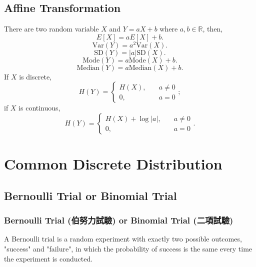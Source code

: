 \documentclass[a4paper,12pt]{report}
\begin{document}
\subsection{Affine Transformation}
There are two random variable $X$ and $Y=aX+b$ where $a,b\in\mathbb{R}$, then,
\[E[X]=aE[X]+b.\]
\[\text{Var}(Y)=a^2\text{Var}(X).\]
\[\text{SD}(Y)=|a|\text{SD}(X).\]
\[\text{Mode}(Y)=a\text{Mode}(X)+b.\]
\[\text{Median}(Y)=a\text{Median}(X)+b.\]
If $X$ is discrete,
\[H(Y)=\begin{cases}H(X),\quad &a\neq 0\\0,\quad &a=0\end{cases};\]
if $X$ is continuous,
\[H(Y)=\begin{cases}H(X)+\log|a|,\quad &a\neq 0\\0,\quad &a=0\end{cases}.\]
\section{Common Discrete Distribution}
\subsection{Bernoulli Trial or Binomial Trial}
\subsubsection{Bernoulli Trial (伯努力試驗) or Binomial Trial (二項試驗)}
A Bernoulli trial is a random experiment with exactly two possible outcomes, "success" and "failure", in which the probability of success is the same every time the experiment is conducted.
\end{document}
